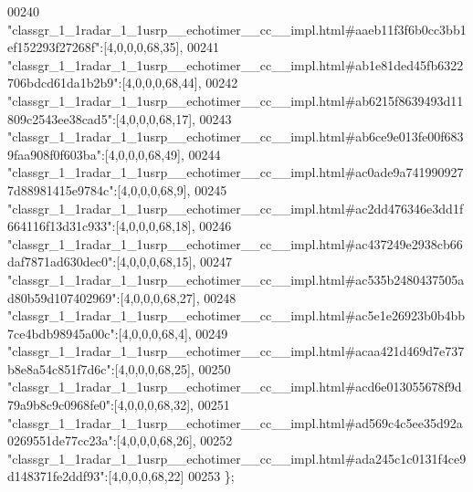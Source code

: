 \begin{DoxyCode}
00240 \textcolor{stringliteral}{"classgr\_1\_1radar\_1\_1usrp\_\_echotimer\_\_cc\_\_impl.html#aaeb11f3f6b0cc3bb1ef152293f27268f"}:[4,0,0,0,68,35],
00241 \textcolor{stringliteral}{"classgr\_1\_1radar\_1\_1usrp\_\_echotimer\_\_cc\_\_impl.html#ab1e81ded45fb6322706bdcd61da1b2b9"}:[4,0,0,0,68,44],
00242 \textcolor{stringliteral}{"classgr\_1\_1radar\_1\_1usrp\_\_echotimer\_\_cc\_\_impl.html#ab6215f8639493d11809c2543ee38cad5"}:[4,0,0,0,68,17],
00243 \textcolor{stringliteral}{"classgr\_1\_1radar\_1\_1usrp\_\_echotimer\_\_cc\_\_impl.html#ab6ce9e013fe00f6839faa908f0f603ba"}:[4,0,0,0,68,49],
00244 \textcolor{stringliteral}{"classgr\_1\_1radar\_1\_1usrp\_\_echotimer\_\_cc\_\_impl.html#ac0ade9a7419909277d88981415e9784c"}:[4,0,0,0,68,9],
00245 \textcolor{stringliteral}{"classgr\_1\_1radar\_1\_1usrp\_\_echotimer\_\_cc\_\_impl.html#ac2dd476346e3dd1f664116f13d31c933"}:[4,0,0,0,68,18],
00246 \textcolor{stringliteral}{"classgr\_1\_1radar\_1\_1usrp\_\_echotimer\_\_cc\_\_impl.html#ac437249e2938cb66daf7871ad630dec0"}:[4,0,0,0,68,15],
00247 \textcolor{stringliteral}{"classgr\_1\_1radar\_1\_1usrp\_\_echotimer\_\_cc\_\_impl.html#ac535b2480437505ad80b59d107402969"}:[4,0,0,0,68,27],
00248 \textcolor{stringliteral}{"classgr\_1\_1radar\_1\_1usrp\_\_echotimer\_\_cc\_\_impl.html#ac5e1e26923b0b4bb7ce4bdb98945a00c"}:[4,0,0,0,68,4],
00249 \textcolor{stringliteral}{"classgr\_1\_1radar\_1\_1usrp\_\_echotimer\_\_cc\_\_impl.html#acaa421d469d7e737b8e8a54c851f7d6c"}:[4,0,0,0,68,25],
00250 \textcolor{stringliteral}{"classgr\_1\_1radar\_1\_1usrp\_\_echotimer\_\_cc\_\_impl.html#acd6e013055678f9d79a9b8c9c0968fe0"}:[4,0,0,0,68,32],
00251 \textcolor{stringliteral}{"classgr\_1\_1radar\_1\_1usrp\_\_echotimer\_\_cc\_\_impl.html#ad569c4c5ee35d92a0269551de77cc23a"}:[4,0,0,0,68,26],
00252 \textcolor{stringliteral}{"classgr\_1\_1radar\_1\_1usrp\_\_echotimer\_\_cc\_\_impl.html#ada245c1c0131f4ce9d148371fe2ddf93"}:[4,0,0,0,68,22]
00253 \};
\end{DoxyCode}
